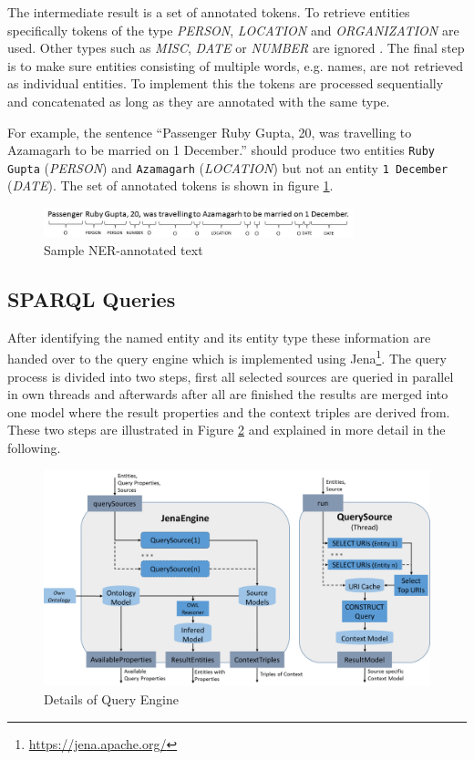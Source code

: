 The intermediate result is a set of annotated tokens. To retrieve entities specifically tokens of the type \textit{PERSON}, \textit{LOCATION} and \textit{ORGANIZATION} are used. Other types such as \textit{MISC}, \textit{DATE} or \textit{NUMBER} are ignored \cite{CoreNLP_NER}. The final step is to make sure entities consisting of multiple words, e.g. names, are not retrieved as individual entities. To implement this the tokens are processed sequentially and concatenated as long as they are annotated with the same type. 

For example, the sentence ``Passenger Ruby Gupta, 20, was travelling to Azamagarh to be married on 1 December.'' should produce two entities \texttt{Ruby Gupta} (\textit{PERSON}) and \texttt{Azamagarh} (\textit{LOCATION}) but not an entity \texttt{1 December} (\textit{DATE}). The set of annotated tokens is shown in figure \ref{fig:nerExample}. 

 \begin{figure}[ht]
	\centering
	\includegraphics[width=0.8\textwidth]{img/nerExample}
	\caption{Sample NER-annotated text}
	\label{fig:nerExample}
\end{figure}
 




\subsection{SPARQL Queries}
\label{sec:sparqlQueries}
After identifying the named entity and its entity type these information are handed over to the query engine which is implemented using Jena\footnote{\url{https://jena.apache.org/}}. The query process is divided into two steps, first all selected sources are queried in parallel in own threads and afterwards after all are finished the results are merged into one model where the result properties and the context triples are derived from. These two steps are illustrated in Figure \ref{fig:details_query} and explained in more detail in the following.
\begin{figure}[ht]
	\centering
	\includegraphics[width=1\textwidth]{img/QueryEngineDetails}
	\caption{Details of Query Engine}
	\label{fig:details_query}
\end{figure}

